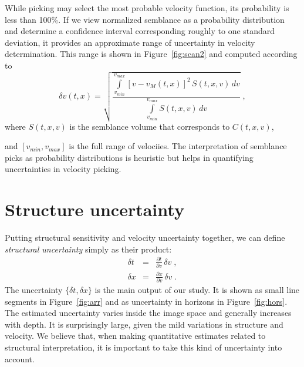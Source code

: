 While picking may select the most probable velocity function, its
probability is less than 100\%. If we view normalized semblance as a
probability distribution and determine a confidence interval 
corresponding roughly to one standard deviation, it provides an
approximate range of uncertainty in velocity determination. This range
is shown in Figure~\ref{fig:scan2} and computed according to
\begin{equation}
\label{eq:std}
\delta v(t,x) = \sqrt{\displaystyle \frac{\int\limits_{v_{min}}^{v_{max}} \left[v-v_M(t,x)\right]^2\,S(t,x,v)\,dv}{\int\limits_{v_{min}}^{v_{max}} S(t,x,v)\,dv}}\;,
\end{equation}
where $S(t,x,v)$ is the semblance volume that corresponds to
$C(t,x,v)$, {and $[v_{min},v_{max}]$ is the full range of
  velociies.  The interpretation of semblance picks as
  probability distributions is heuristic but helps in quantifying
  uncertainties in velocity picking.

\section{Structure uncertainty}



Putting structural sensitivity and velocity uncertainty together, we
can define \emph{structural uncertainty} simply as their product: 
\begin{eqnarray}
\label{eq:dt}
\delta t & = & \displaystyle \frac{\partial t}{\partial v}\,\delta v\;, \\
\label{eq:dx}
\delta x & = & \displaystyle \frac{\partial x}{\partial v}\,\delta v\;. 
\end{eqnarray}
The uncertainty $\{\delta t,\delta x\}$ is the main output of our
study. It is shown as small line segments in Figure~\ref{fig:arr}
and as uncertainty in horizons in Figure~\ref{fig:hors}.  The
estimated uncertainty varies inside the image space and generally
increases with depth. It is surprisingly large, given the mild
variations in structure and velocity. We believe that, when making
quantitative estimates related to structural interpretation, it is
important to take this kind of uncertainty into account.

}
